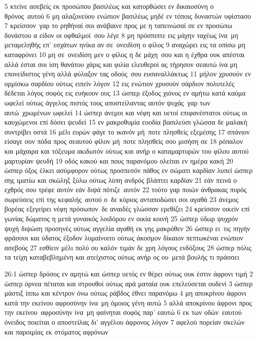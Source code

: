 \documentclass[10pt,oneside,footinclude=true,headinclude=true]{scrbook} %
\begin{document}
5 κτείνε ασεβείς εκ προσώπου βασιλέως και κατορθώσει εν δικαιοσύνη ο θρόνος αυτού
6 μη αλαζονεύου ενώπιον βασιλέως μηδέ εν τόποις δυναστών υφίστασο
7 κρείσσον γαρ το ρηθήναί σοι ανάβαινε προς με η ταπεινώσαί σε εν προσώπω δυνάστου α είδον οι οφθαλμοί σου λέγε
8 μη πρόσπιπτε εις μάχην ταχέως ίνα μη μεταμεληθής επ' εσχάτων ηνίκα αν σε ονειδίση ο φίλος
9 αναχώρει εις τα οπίσω μη καταφρόνει
10 μη σε ονειδίση μεν ο φίλος η δε μάχη σου και η έχθρα ουκ απέσται αλλά έσται σοι ίση θανάτου χάρις και φιλία ελευθεροί ας τήρησον σεαυτώ ίνα μη επονείδιστος γένη αλλά φύλαξον τας οδούς σου ευσαναλλάκτως
11 μήλον χρυσούν εν ορμίσκω σαρδίου ούτως ειπείν λόγον
12 εις ενώτιον χρυσούν σάρδιον πολυτελές δέδεται λόγος σοφός εις ευήκοον ους
13 ώσπερ έξοδος χιόνος εν αμήτω κατά καύμα ωφελεί ούτως άγγελος πιστός τους αποστείλαντας αυτόν ψυχάς γαρ των αυτώ χρωμένων ωφελεί
14 ώσπερ άνεμοι και νέφη και υετοί επιφανέστατοι ούτως οι καυχώμενοι επί δόσει ψευδεί
15 εν μακροθυμία ευοδία βασιλεύσι γλώσσα δε μαλακή συντρίβει οστά
16 μέλι ευρών φάγε το ικανόν μή ποτε πλησθείς εξεμέσης
17 σπάνιον είσαγε σον πόδα προς σεαυτού φίλον μή ποτε πλησθείς σου μισήση σε
18 ρόπαλον και μάχαιρα και τόξευμα ακιδωτόν ούτως και ανήρ ο καταμαρτυρών του φίλου αυτού μαρτυρίαν ψευδή
19 οδός κακού και πους παρανόμου ολείται εν ημέρα κακή
20 ώσπερ όξος έλκει ασύμφορον ούτως προσπεσόν πάθος εν σώματι καρδίαν λυπεί ώσπερ σης ιματίω και σκώληξ ξύλω ούτως λύπη ανδρός βλάπτει καρδίαν
21 εάν πεινά ο εχθρός σου τρέφε αυτόν εάν διψά πότιζε αυτόν
22 τούτο γαρ ποιών άνθρακας πυρός σωρεύσεις επί της κεφαλής αυτού ο δε κύριος ανταποδώσει σοι αγαθά
23 άνεμος βορέας εξεγείρει νέφη πρόσωπον δε αναιδές γλώσσαν ερεθίζει
24 κρείσσον οικείν επί γωνίας δώματος η μετά γυναικός λοιδόρου εν οικία κοινή
25 ώσπερ ύδωρ ψυχρόν ψυχή διψώση προσηνές ούτως αγγελία αγαθή εκ γης μακρόθεν
26 ώσπερ ει τις πηγήν φράσσοι και ύδατος έξοδον λυμαίνοιτο ούτως άκοσμον δίκαιον πεπτωκέναι ενώπιον ασεβούς
27 εσθίειν μέλι πολύ ου καλόν τιμάν δε χρη λόγους ενδόξους
28 ώσπερ πόλις τα τείχη καταβεβλημένη και ατείχιστος ούτως ανήρ ος ου μετά βουλής τι πράσσει
\par
26:1 ώσπερ δρόσος εν αμητώ και ώσπερ υετός εν θέρει ούτως ουκ έστιν άφρονι τιμή
2 ώσπερ όρνεα πέταται και στρουθοί ούτως αρά ματαία ουκ επελεύσεται ουδενί
3 ώσπερ μάστιξ ίππω και κέντρον όνω ούτως ράβδος έθνει παρανόμω
4 μη αποκρίνου άφρονι κατά την εκείνου αφροσύνην ίνα μη όμοιος γένη αυτώ
5 αλλά αποκρίνου άφρονι προς την εκείνου αφροσύνην ίνα μη φαίνηται σοφός παρ' εαυτώ
6 εκ των οδών εαυτού όνειδος ποιείται ο αποστείλας δι' αγγέλου άφρονος λόγον
7 αφελού πορείαν σκελών και παροιμίας εκ στόματος αφρόνων
\end{document}
